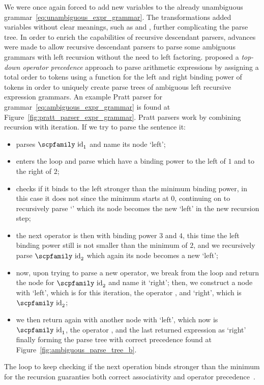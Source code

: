 \documentclass[
  oneside,
  english,
  coorientadorbanca,
  noabntexcite
]{ufsc-thesis-rn46-2019}
\newcommand{\codett}[1]{\text{\scpfamily#1}}
\newcommand{\code}[1]{\text{\scpfamily\setlength\spaceskip{0.35em}#1}}
\newcommand{\bnfvar}[1]{\codett{#1}}
\newcommand{\bnfter}[1]{\textrm{`}\codett{#1}\textrm{'}}
\begin{document}
We were once again forced to add new variables to the already unambiguous grammar~\eqref{eq:unambiguous_expr_grammar}.
The transformations added variables without clear meanings, such as \bnfvar{Expr2} and \bnfvar{Term2}, further complicating the parse tree.
In order to enrich the capabilities of recursive descendant parsers, advances were made to allow recursive descendant parsers to parse some ambiguous grammars with left recursion without the need to left factoring.
\textcite{pratt1973operatorprecedence} proposed a \textit{top-down operator precedence} approach to parse arithmetic expressions by assigning a total order to tokens using a function for the left and right binding power of tokens in order to uniquely create parse trees of ambiguous left recursive expression grammars.
An example Pratt parser for grammar~\eqref{eq:ambiguous_expr_grammar} is found at Figure~\ref{fig:pratt_parser_expr_grammar}.
Pratt parsers work by combining recursion with iteration.
If we try to parse the sentence \code{$\code{id}_1$ + number * $\code{id}_2$} it:
\begin{itemize}
  \item parses $\codett{id}_1$ and name its node `left';
  \item enters the loop and parse \codett{+} which have a binding power to the left of $1$ and to the right of $2$;
  \item checks if it binds to the left stronger than the minimum binding power, in this case it does not since the minimum starts at $0$, continuing on to recursively parse \bnfter{number} which its node becomes the new `left' in the new recursion step;
  \item the next operator is then \codett{*} with binding power $3$ and $4$, this time the left binding power still is not smaller than the minimum of $2$, and we recursively parse $\codett{id}_2$ which again its node becomes a new `left';
  \item now, upon trying to parse a new operator, we break from the loop and return the node for $\codett{id}_2$ and name it `right'; then, we construct a node \bnfvar{Expr} with `left', which is \codett{number} for this iteration, the operator \codett{*}, and `right', which is $\codett{id}_2$;
  \item we then return again with another \bnfvar{Expr} node with `left', which now is $\codett{id}_1$, the operator \codett{+}, and the last returned expression as `right' finally forming the parse tree with correct precedence found at Figure~\ref{fig:ambiguous_parse_tree_b}.
\end{itemize}
The loop to keep checking if the next operation binds stronger than the minimum for the recursion guaranties both correct associativity and operator precedence~\cite{pratt1973operatorprecedence}.
\end{document}
